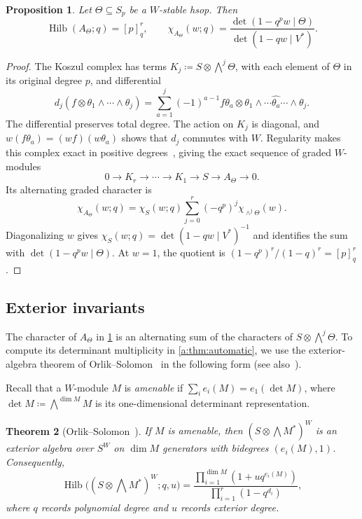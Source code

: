 \documentclass[11pt]{amsart}
\newcommand{\defeq}{\coloneqq}
\newcommand{\defn}[1]{\emph{\color{darkblue}#1}}
\newtheorem{theorem}{Theorem}[section]
\newtheorem{proposition}[theorem]{Proposition}
\theoremstyle{definition}
\DeclareMathOperator{\Hilb}{Hilb}\DeclareMathOperator{\Res}{Res}
\begin{document}
\begin{proposition}\label{prop:koszul}
Let $\Theta\subseteq S_p$ be a $W$-stable hsop. Then
\[
 \Hilb(A_\Theta;q)=[p]_q^r,
 \qquad
 \chi_{A_\Theta}(w;q)=
 \frac{\det(1-q^p w\mid\Theta)}{\det(1-qw\mid V^*)}.
\]
\end{proposition}
\begin{proof}
The Koszul complex has terms
$K_j\defeq S\otimes\bigwedge^j\Theta$, with each element of $\Theta$
in its original degree $p$, and differential
\[
 d_j(f\otimes\theta_1\wedge\cdots\wedge\theta_j)
 =\sum_{a=1}^j(-1)^{a-1}f\theta_a\otimes
       \theta_1\wedge\cdots\widehat{\theta_a}\cdots\wedge\theta_j.
\]
The differential preserves total degree. The action on $K_j$ is diagonal,
and $w(f\theta_a)=(wf)(w\theta_a)$ shows that $d_j$ commutes with $W$.
Regularity makes this complex exact in positive degrees~\cite[Lemma~15.31.2]{Stacks},
giving the exact sequence of graded $W$-modules
\[
 0\longrightarrow K_r\longrightarrow\cdots\longrightarrow K_1
 \longrightarrow S\longrightarrow A_\Theta\longrightarrow0.
\]
Its alternating graded character is
\[
 \chi_{A_\Theta}(w;q)
 =\chi_S(w;q)\sum_{j=0}^r(-q^p)^j\chi_{\wedge^j\Theta}(w).
\]
Diagonalizing $w$ gives
$\chi_S(w;q)=\det(1-qw\mid V^*)^{-1}$ and identifies the sum with
$\det(1-q^pw\mid\Theta)$. At $w=1$, the quotient is
$(1-q^p)^r/(1-q)^r=[p]_q^r$.
\end{proof}

\subsection{Exterior invariants}\label{b:sec:exterior}

The character of $A_\Theta$ in \cref{prop:koszul} is an alternating
sum of the characters of $S\otimes\bigwedge^j\Theta$. To compute its
determinant multiplicity in \cref{a:thm:automatic},
we use the exterior-algebra theorem of
Orlik--Solomon~\cite[Theorem~3.1]{OS} in the following form
(see also~\cite[Theorem~2.7]{AW}).

Recall that a $W$-module $M$ is \defn{amenable} if
$\sum_i e_i(M)=e_1(\det M)$, where
$\det M\defeq\bigwedge^{\dim M}M$ is its one-dimensional determinant
representation.

\begin{theorem}[{Orlik--Solomon~\cite[Theorem~3.1]{OS}}]
\label{b:thm:OS}
If $M$ is amenable, then $(S\otimes\bigwedge M^*)^W$ is an exterior
algebra over $S^W$ on $\dim M$ generators with bidegrees
$(e_i(M),1)$. Consequently,
\[
 \Hilb\bigl((S\otimes\textstyle\bigwedge M^*)^W;q,u\bigr)
 =\frac{\prod_{i=1}^{\dim M}(1+uq^{e_i(M)})}
        {\prod_{i=1}^r(1-q^{d_i})},
\]
where $q$ records polynomial degree and $u$ records exterior degree.
\end{theorem}
\end{document}
